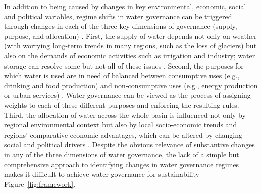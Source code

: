 In addition to being caused by changes in key environmental, economic, social and political variables, regime shifts in water governance can be triggered through changes in each of the three key dimensions of governance (supply, purpose, and allocation) 
\cite{undpwatergovernancefacilityWaterGovernanceIssue, mariajacobsonUserguideassessing2013, kjellenWatergovernanceperspective2015}. 
First, the supply of water depends not only on weather (with worrying long-term trends in many regions, such as the loss of glaciers) but also on the demands of economic activities such as irrigation and industry; water storage can resolve some but not all of these issues 
\cite{greveGlobalassessmentwater2018,wadaHumanwaterinterface2017,qinFlexibilityintensityglobal2019}. 
Second, the purposes for which water is used are in need of balanced between consumptive uses (e.g., drinking and food production) and non-consumptive uses (e.g., energy production or urban services) 
\cite{liuWaterscarcityassessments2017,florkeWatercompetitioncities2018,kleemannQuantifyinginterregionalflows2020}. 
Water governance can be viewed as the process of assigning weights to each of these different purposes and enforcing the resulting rules. 
Third, the allocation of water across the whole basin is influenced not only by regional environmental context but also by local socio-economic trends and regions’ comparative economic advantages, which can be altered by changing social and political drivers 
\cite{roobavannanRoleSectoralTransformation2017,speedBasinwaterallocation2013}. 
Despite the obvious relevance of substantive changes in any of the three dimensions of water governance, the lack of a simple but comprehensive approach to identifying changes in water governance regimes makes it difficult to achieve water governance for sustainability Figure~\ref{fig:framework}.

